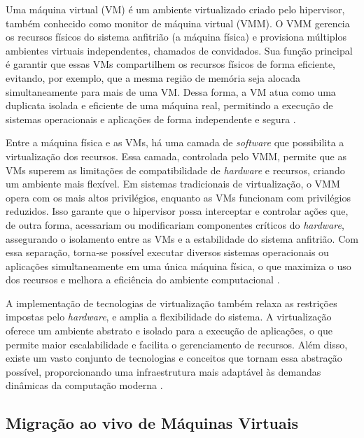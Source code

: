 \documentclass[
	12pt,				%
	oneside,			%
	a4paper,			%
	english,			%
	brazil				%
	]{abntex2ppgsi}
\begin{document}
Uma máquina virtual (VM) é um ambiente virtualizado criado pelo hipervisor, também conhecido como monitor de máquina virtual (VMM). O VMM gerencia os recursos físicos do sistema anfitrião (a máquina física) e provisiona múltiplos ambientes virtuais independentes, chamados de convidados. Sua função principal é garantir que essas VMs compartilhem os recursos físicos de forma eficiente, evitando, por exemplo, que a mesma região de memória seja alocada simultaneamente para mais de uma VM. Dessa forma, a VM atua como uma duplicata isolada e eficiente de uma máquina real, permitindo a execução de sistemas operacionais e aplicações de forma independente e segura \cite{10.1145/361011.361073}.

Entre a máquina física e as VMs, há uma camada de \textit{software} que possibilita a virtualização dos recursos. Essa camada, controlada pelo VMM, permite que as VMs superem as limitações de compatibilidade de \textit{hardware} e recursos, criando um ambiente mais flexível. Em sistemas tradicionais de virtualização, o VMM opera com os mais altos privilégios, enquanto as VMs funcionam com privilégios reduzidos. Isso garante que o hipervisor possa interceptar e controlar ações que, de outra forma, acessariam ou modificariam componentes críticos do \textit{hardware}, assegurando o isolamento entre as VMs e a estabilidade do sistema anfitrião. Com essa separação, torna-se possível executar diversos sistemas operacionais ou aplicações simultaneamente em uma única máquina física, o que maximiza o uso dos recursos e melhora a eficiência do ambiente computacional \cite{1430629}.

A implementação de tecnologias de virtualização também relaxa as restrições impostas pelo \textit{hardware}, e amplia a flexibilidade do sistema. A virtualização oferece um ambiente abstrato e isolado para a execução de aplicações, o que permite maior escalabilidade e facilita o gerenciamento de recursos. Além disso, existe um vasto conjunto de tecnologias e conceitos que tornam essa abstração possível, proporcionando uma infraestrutura mais adaptável às demandas dinâmicas da computação moderna \cite{10.5555/2531413}.

\subsection{Migração ao vivo de Máquinas Virtuais}\label{section:migracao-ao-vivo-maquinas-virtuais}
\end{document}
